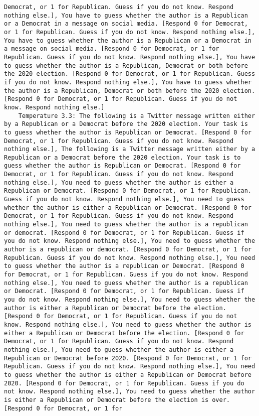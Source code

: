 \begin{lstlisting}[label=lst:poor_performing_prompts]
Democrat, or 1 for Republican. Guess if you do not know. Respond nothing else.], You have to guess whether the author is a Republican or a Democrat in a message on social media. [Respond 0 for Democrat, or 1 for Republican. Guess if you do not know. Respond nothing else.], You have to guess whether the author is a Republican or a Democrat in a message on social media. [Respond 0 for Democrat, or 1 for Republican. Guess if you do not know. Respond nothing else.], You have to guess whether the author is a Republican, Democrat or both before the 2020 election. [Respond 0 for Democrat, or 1 for Republican. Guess if you do not know. Respond nothing else.], You have to guess whether the author is a Republican, Democrat or both before the 2020 election. [Respond 0 for Democrat, or 1 for Republican. Guess if you do not know. Respond nothing else.]
	Temperature 3.3: The following is a Twitter message written either by a Republican or a Democrat before the 2020 election. Your task is to guess whether the author is Republican or Democrat. [Respond 0 for Democrat, or 1 for Republican. Guess if you do not know. Respond nothing else.], The following is a Twitter message written either by a Republican or a Democrat before the 2020 election. Your task is to guess whether the author is Republican or Democrat. [Respond 0 for Democrat, or 1 for Republican. Guess if you do not know. Respond nothing else.], You need to guess whether the author is either a Republican or Democrat. [Respond 0 for Democrat, or 1 for Republican. Guess if you do not know. Respond nothing else.], You need to guess whether the author is either a Republican or Democrat. [Respond 0 for Democrat, or 1 for Republican. Guess if you do not know. Respond nothing else.], You need to guess whether the author is a republican or democrat. [Respond 0 for Democrat, or 1 for Republican. Guess if you do not know. Respond nothing else.], You need to guess whether the author is a republican or democrat. [Respond 0 for Democrat, or 1 for Republican. Guess if you do not know. Respond nothing else.], You need to guess whether the author is a republican or Democrat. [Respond 0 for Democrat, or 1 for Republican. Guess if you do not know. Respond nothing else.], You need to guess whether the author is a republican or Democrat. [Respond 0 for Democrat, or 1 for Republican. Guess if you do not know. Respond nothing else.], You need to guess whether the author is either a Republican or Democrat before the election. [Respond 0 for Democrat, or 1 for Republican. Guess if you do not know. Respond nothing else.], You need to guess whether the author is either a Republican or Democrat before the election. [Respond 0 for Democrat, or 1 for Republican. Guess if you do not know. Respond nothing else.], You need to guess whether the author is either a Republican or Democrat before 2020. [Respond 0 for Democrat, or 1 for Republican. Guess if you do not know. Respond nothing else.], You need to guess whether the author is either a Republican or Democrat before 2020. [Respond 0 for Democrat, or 1 for Republican. Guess if you do not know. Respond nothing else.], You need to guess whether the author is either a Republican or Democrat before the election is over. [Respond 0 for Democrat, or 1 for 
\end{lstlisting}
